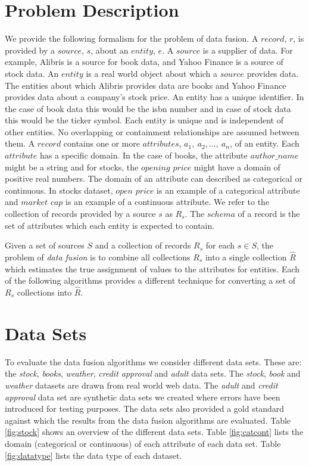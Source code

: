 \documentclass{acm_proc_article-sp}
\begin{document}
\section{Problem Description}
We provide the following formalism for the problem of data fusion. A $record$, $r$, is provided by a $source$, $s$, about an $entity$, $e$. A $source$ is a supplier of data. For example, Alibris is a source for book data, and Yahoo Finance is a source of stock data.  An $entity$ is a real world object about which a $source$ provides data. The entities about which Alibris provides data are books and Yahoo Finance provides data about a company's stock price. An entity has a unique identifier. In the case of book data this would be the isbn number and in case of stock data this would be the ticker symbol. Each entity is unique and is independent of other entities. No overlapping or containment relationships are assumed between them. A $record$ contains one or more $attributes$, $a_1,\ a_2,\dots,\ a_n$, of an entity. Each $attribute$ has a specific domain. In the case of books, the attribute $author\_name$ might be a string and for stocks, the $opening$ $price$ might have a domain of positive real numbers.  The domain of an attribute can described as categorical or continuous. In stocks dataset, $open$ $price$ is an example of a categorical attribute and $market$ $cap$  is an example of a continuous attribute. We refer to the collection of records provided by a source $s$ as $R_s$. The $schema$ of a record is the set of attributes which each entity is expected to contain. 


Given a set of sources $S$ and a collection of records $R_s$ for each $s \in S$, the problem of \emph{data fusion} is to combine all collections $R_s$ into a single collection $\hat{R}$ which estimates the true assignment of values to the attributes for entities.  Each of the following algorithms provides a different technique for converting a set of $R_s$ collections into $\hat{R}$. 

\section{Data Sets} \label{sec:data_sets}
To evaluate the data fusion algorithms we consider different data sets. These are: the \emph{stock}, \emph{books}, \emph{weather}, \emph{credit approval} and \emph{adult} data sets. The \emph{stock}, \emph{book} and \emph{weather} datasets are drawn from real world web data. The \emph{adult} and \emph{credit approval} data set are synthetic data sets we created where errors have been introduced for testing purposes. The data sets also provided a gold standard against which the results from the data fusion algorithms are evaluated. Table \ref{fig:stock} shows an overview of the different data sets. Table \ref{fig:catcont} lists the domain (categorical or continuous) of each attribute of each data set. Table \ref{fig:datatype} lists the data type of each dataset.  \\
\end{document}

